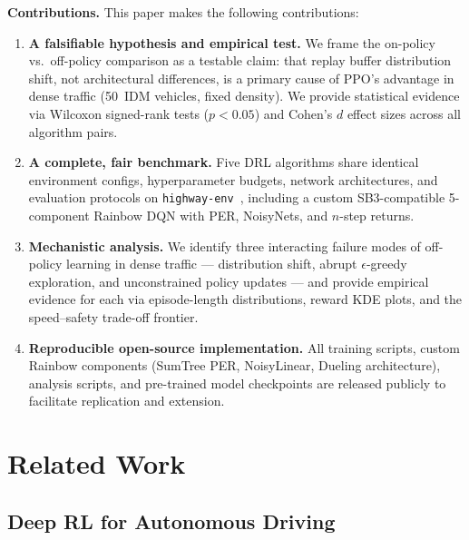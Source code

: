 \documentclass[conference]{IEEEtran}
\begin{document}
\textbf{Contributions.} This paper makes the following contributions:
\begin{enumerate}
  \item \textbf{A falsifiable hypothesis and empirical test.} We frame the on-policy
        vs.\ off-policy comparison as a testable claim: that replay buffer distribution
        shift, not architectural differences, is a primary cause of PPO's advantage
        in dense traffic (50~IDM vehicles, fixed density). We provide statistical
        evidence via Wilcoxon signed-rank tests ($p < 0.05$) and Cohen's $d$ effect
        sizes across all algorithm pairs.
  \item \textbf{A complete, fair benchmark.} Five DRL algorithms share identical
        environment configs, hyperparameter budgets, network architectures, and evaluation
        protocols on \texttt{highway-env}~\cite{highway-env}, including a custom
        SB3-compatible 5-component Rainbow DQN with PER, NoisyNets, and $n$-step returns.
  \item \textbf{Mechanistic analysis.} We identify three interacting failure modes of
        off-policy learning in dense traffic — distribution shift, abrupt $\epsilon$-greedy
        exploration, and unconstrained policy updates — and provide empirical evidence
        for each via episode-length distributions, reward KDE plots, and the
        speed--safety trade-off frontier.
  \item \textbf{Reproducible open-source implementation.} All training scripts, custom
        Rainbow components (SumTree PER, NoisyLinear, Dueling architecture), analysis
        scripts, and pre-trained model checkpoints are released publicly to facilitate
        replication and extension.
\end{enumerate}

\section{Related Work}

\subsection{Deep RL for Autonomous Driving}
\end{document}
